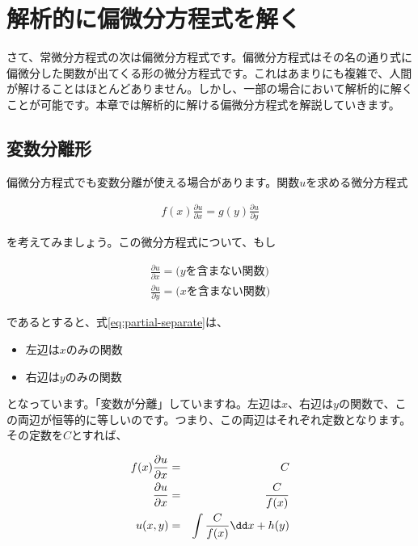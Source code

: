 \chapter{解析的に偏微分方程式を解く}
\label{analytical-partial}
さて、常微分方程式の次は偏微分方程式です。偏微分方程式はその名の通り式に偏微分した関数が出てくる形の微分方程式です。これはあまりにも複雑で、人間が解けることはほとんどありません。しかし、一部の場合において解析的に解くことが可能です。本章では解析的に解ける偏微分方程式を解説していきます。







\section{変数分離形}
\label{partial-separate}
偏微分方程式でも変数分離が使える場合があります。関数$u$を求める微分方程式

\begin{eqnarray}
    f(x)\frac{\partial u}{\partial x}=g(y)\frac{\partial u}{\partial y}
    \label{eq:partial-separate}
\end{eqnarray}

\noindent
を考えてみましょう。この微分方程式について、もし

\begin{eqnarray}
    \frac{\partial u}{\partial x}=\mbox{($y$を含まない関数)} \\
    \frac{\partial u}{\partial y}=\mbox{($x$を含まない関数)}
\end{eqnarray}

\noindent
であるとすると、式\ref{eq:partial-separate}は、

\begin{itemize}
    \item 左辺は$x$のみの関数
    \item 右辺は$y$のみの関数
\end{itemize}

\noindent
となっています。「変数が分離」していますね。左辺は$x$、右辺は$y$の関数で、この両辺が恒等的に等しいのです。つまり、この両辺はそれぞれ定数となります。その定数を$C$とすれば、

\begin{eqnarray}
    f(x)\frac{\partial u}{\partial x}&=&C \\
    \frac{\partial u}{\partial x}&=&\frac{C}{f(x)} \nonumber \\
    u(x,y)&=&\int\frac{C}{f(x)}\dd x+h(y) \setcounter{equation}{5}
    \label{eq:pqrtial-separate-1}
\end{eqnarray}

